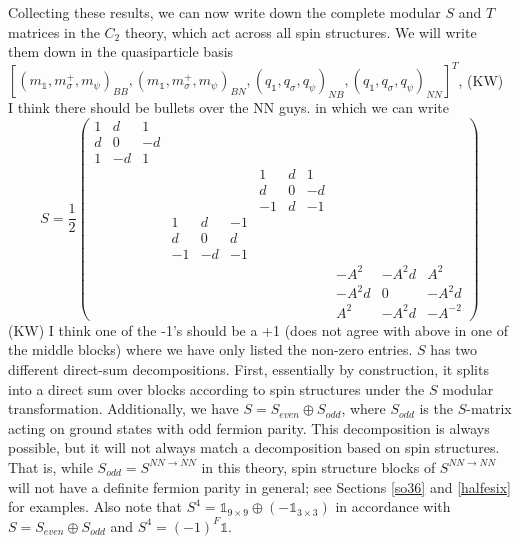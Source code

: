 \documentclass[12pt,a4paper]{article}
\newcounter{arrow}
\newcommand{\ra}{\rightarrow}
\newcommand{\unit}{\mathds{1}}
\newcommand\be            {\begin{equation}}
\newcommand\ee            {\end{equation}}
\newcommand{\kw}[1]{{\color{kwcolor}\footnotesize{(KW) #1}}}
\begin{document}
Collecting these results, we can now write down the complete modular $S$ and $T$ matrices in the $C_2$ theory, 
which act across all spin structures. 
We will write them down in the quasiparticle 
basis $[(m_\unit,m_\sigma^+,m_\psi)_{BB},(m_\unit,m_\sigma^+,m_\psi)_{BN},(q_\unit,q_\sigma,q_\psi)_{NB},(q_\unit,q_\sigma,q_\psi)_{NN}]^T$, 
\kw{I think there should be bullets over the NN guys.}
in which we can write
\be \label{modularS}
S = \frac{1}{2}\begin{pmatrix} 1 & d & 1 &			&&&			&&&			&& \\ 
					      d & 0 &-d &			&&&			&&&			&&\\
					      1&-d&1 & 			&&&			&&&			&&\\
						&&&				&&&			1&d&1&		&& \\
						&&&				&&&			d&0&-d&		&&\\ %
						&&&				&&&			-1&d&-1&		&&\\
						&&&				1&d&-1&		&&&			&&\\ %
						&&&				d&0&d&		&&&			&&\\
						&&&				-1&-d&-1&		&&&			&&\\ %
						&&&				&&&			&&&			-A^{2} & -A^{2}d & A^{2}\\
						&&&				&&&			&&&			-A^{2}d & 0 & -A^{2}d \\ 
						&&&				&&&			&&&			A^{2} & -A^{2}d & -A^{-2} \end{pmatrix}\ee		
\kw{I think one of the -1's should be a +1 (does not agree with above in one of the middle blocks)}
where we have only listed the non-zero entries. 
$S$ has two different direct-sum decompositions. First, essentially by construction, 
it splits into a direct sum over blocks according to spin structures 
under the $S$ modular transformation. 
Additionally, we have $S = S_{even} \oplus S_{odd}$, where $S_{odd}$ is the $S$-matrix 
acting on ground states with odd fermion parity.
This decomposition is always possible, but it will not always match a decomposition based 
on spin structures. 
That is, while $S_{odd} = S^{NN\ra NN}$ in this theory, spin structure blocks of $S^{NN\ra NN}$ 
will not have a definite fermion parity in general; see Sections \ref{so36} and \ref{halfesix} for examples. 
Also note that $S^4 = \unit_{9\times9}\oplus(-\unit_{3\times3})$ in accordance with $S = S_{even} \oplus S_{odd}$ and $S^4=(-1)^F\unit$. 
\end{document}
